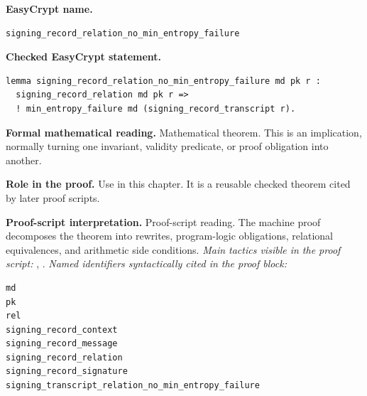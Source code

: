 \begin{formaltheorem}
\noindent\textbf{EasyCrypt name.}
\begin{lstlisting}[language=EasyCrypt,basicstyle=\ttfamily\scriptsize]
signing_record_relation_no_min_entropy_failure
\end{lstlisting}
\noindent\textbf{Checked EasyCrypt statement.}
\begin{lstlisting}[language=EasyCrypt,basicstyle=\ttfamily\scriptsize]
lemma signing_record_relation_no_min_entropy_failure md pk r :
  signing_record_relation md pk r =>
  ! min_entropy_failure md (signing_record_transcript r).
\end{lstlisting}
\noindent\textbf{Formal mathematical reading.}
Mathematical theorem. This is an implication, normally turning one invariant, validity predicate, or proof obligation into another.

\noindent\textbf{Role in the proof.}
Use in this chapter. It is a reusable checked theorem cited by later proof scripts.

\noindent\textbf{Proof-script interpretation.}
Proof-script reading. The machine proof decomposes the theorem into rewrites, program-logic obligations, relational equivalences, and arithmetic side conditions.
\emph{Main tactics visible in the proof script:} , .
\emph{Named identifiers syntactically cited in the proof block:}
\begin{lstlisting}[language=EasyCrypt,basicstyle=\ttfamily\scriptsize]
md
pk
rel
signing_record_context
signing_record_message
signing_record_relation
signing_record_signature
signing_transcript_relation_no_min_entropy_failure
\end{lstlisting}

\end{formaltheorem}

